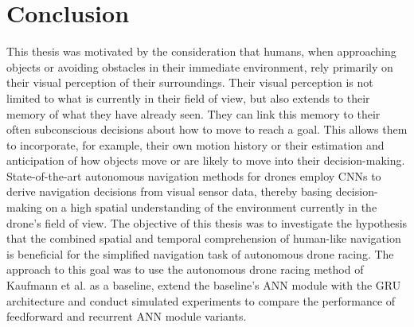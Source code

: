\section{Conclusion}
This thesis was motivated by the consideration that humans, 
when approaching objects or avoiding obstacles in their immediate environment, 
rely primarily on their visual perception of their surroundings. 
Their visual perception is not limited to what is currently in their field of view, 
but also extends to their memory of what they have already seen. 
They can link this memory to their often subconscious decisions about how to move to reach a goal. 
This allows them to incorporate, for example, their own motion history or their estimation and anticipation 
of how objects move or are likely to move into their decision-making. 
State-of-the-art autonomous navigation methods for drones employ CNNs to derive navigation decisions 
from visual sensor data, thereby basing decision-making on a high spatial understanding of the environment 
currently in the drone's field of view. The objective of this thesis was to investigate the hypothesis that 
the combined spatial and temporal comprehension of human-like navigation is beneficial 
for the simplified navigation task of autonomous drone racing. The approach to this goal was to use the 
autonomous drone racing method of Kaufmann et al. \cite{Kaufmann2018} as a baseline, extend the baseline's ANN module 
with the GRU architecture and conduct simulated experiments to compare the performance of feedforward and recurrent 
ANN module variants.




